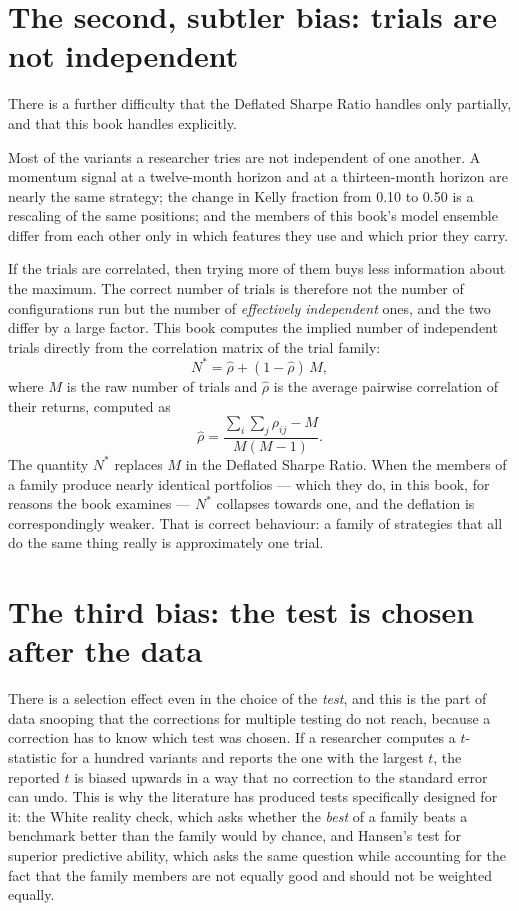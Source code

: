 \section{The second, subtler bias: trials are not independent}

There is a further difficulty that the Deflated Sharpe Ratio handles only
partially, and that this book handles explicitly.

Most of the variants a researcher tries are not independent of one another.
A momentum signal at a twelve-month horizon and at a thirteen-month horizon
are nearly the same strategy; the change in Kelly fraction from 0.10 to
0.50 is a rescaling of the same positions; and the members of this book's
model ensemble differ from each other only in which features they use and
which prior they carry.

If the trials are correlated, then trying more of them buys less
information about the maximum. The correct number of trials is therefore
not the number of configurations run but the number of
\emph{effectively independent} ones, and the two differ by a large factor.
This book computes the implied number of independent trials directly from
the correlation matrix of the trial family:
\begin{equation}
N^{*} = \hat{\rho} + (1 - \hat{\rho})\,M,
\end{equation}
where \(M\) is the raw number of trials and \(\hat{\rho}\) is the average
pairwise correlation of their returns, computed as
\begin{equation}
\hat{\rho} = \frac{\sum_{i}\sum_{j}\rho_{ij} - M}{M(M-1)}.
\end{equation}
The quantity \(N^{*}\) replaces \(M\) in the Deflated Sharpe Ratio. When
the members of a family produce nearly identical portfolios --- which they
do, in this book, for reasons the book examines --- \(N^{*}\) collapses
towards one, and the deflation is correspondingly weaker. That is correct
behaviour: a family of strategies that all do the same thing really is
approximately one trial.

\section{The third bias: the test is chosen after the data}

There is a selection effect even in the choice of the \emph{test}, and
this is the part of data snooping that the corrections for multiple
testing do not reach, because a correction has to know which test was
chosen. If a researcher computes a \(t\)-statistic for a hundred variants
and reports the one with the largest \(t\), the reported \(t\) is biased
upwards in a way that no correction to the standard error can undo. This is why the
literature has produced tests specifically designed for it: the White
reality check, which asks whether the \emph{best} of a family beats a
benchmark better than the family would by chance, and Hansen's test for
superior predictive ability, which asks the same question while accounting
for the fact that the family members are not equally good and should not be
weighted equally.

